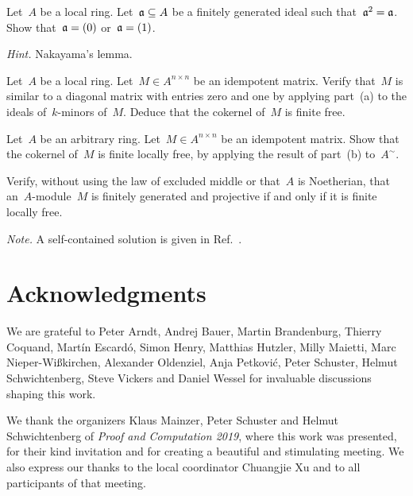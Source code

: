 \documentclass{ws-rv9x6}
\begin{document}
{\begin{exercise}%
\begin{alphlist}[(c)]
\item Let~$A$ be a local ring. Let~$\mathfrak{a} \subseteq A$ be a finitely generated
ideal such that~$\mathfrak{a}^2 = \mathfrak{a}$. Show that~$\mathfrak{a} = (0)$ or~$\mathfrak{a} = (1)$.\smallskip

{\scriptsize\emph{Hint.} Nakayama's lemma.\par}
\item Let~$A$ be a local ring. Let~$M \in A^{n \times n}$ be an idempotent
matrix. Verify that~$M$ is similar to a diagonal matrix with entries zero and
one by applying part~(a) to the ideals of~$k$-minors of~$M$. Deduce that the
cokernel of~$M$ is finite free.
\item Let~$A$ be an arbitrary ring. Let~$M \in A^{n \times n}$ be an idempotent
matrix. Show that the cokernel of~$M$ is finite locally free, by applying the
result of part~(b) to~$A^\sim$.
\item Verify, without using the law of excluded middle or that~$A$ is
Noetherian, that an~$A$-module~$M$ is finitely generated and projective if and
only if it is finite locally free.\smallskip

{\scriptsize\emph{Note.} A self-contained solution is given in
Ref.~.\par}
\end{alphlist}
\end{exercise}


\section*{Acknowledgments}

We are grateful to Peter Arndt, Andrej Bauer,
Martin Brandenburg, Thierry Coquand, Martín Escardó, Simon Henry, Matthias
Hutzler, Milly Maietti, Marc Nieper-Wißkirchen, Alexander Oldenziel, Anja
Petković, Peter Schuster, Helmut Schwichtenberg, Steve Vickers and Daniel
Wessel for invaluable discussions shaping this work.

We thank the
organizers Klaus Mainzer, Peter Schuster and Helmut Schwich\-ten\-berg of
\emph{Proof and Computation 2019}, where this work was presented, for their
kind invitation and for creating a beautiful and stimulating meeting. We also
express our thanks to the local coordinator Chuangjie Xu and to all
participants of that meeting.

}




\end{document}
